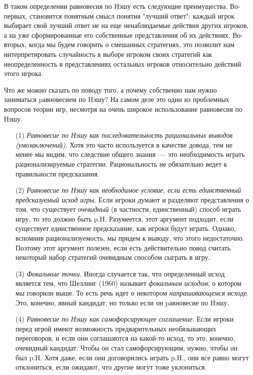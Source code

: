 {В таком определении равновесия по Нэшу есть следующие преимущества.
Во-первых, становится понятным смысл понятия "лучший ответ": каждый
игрок выбирает свой лучший ответ не на еще ненаблюдаемые действия
других игроков, а на уже сформированные его собственные
представления об их действиях. Во-вторых, когда мы будем говорить о
смешанных стратегиях, это позволит нам интерпретировать случайность
в выборе игроком своих стратегий как неопределенность в
представлениях остальных игроков относительно действий этого игрока.


Что же можно сказать по поводу того, а почему собственно нам нужно
заниматься pавновесием по Hэшу? На самом деле это один из проблемных вопросов
теории игр, несмотря на очень широкое использование равновесия по Нэшу.
\begin{itemize}
\item[(1)] {\it Равновесие по Нэшу как последовательность рациональных
выводов (умозаключений)}. Хотя это часто используется в качестве
довода, тем не менее мы видим, что следствие общего знания~--- это
необходимость играть рационализируемые стратегии.  Рациональность не
обязательно ведет к правильности предсказания.

\item[(2)] {{\it Равновесие по Нэшу как необходимое условие, если есть
единственный предсказуемый исход игры}. Если игроки думают и
разделяют представления о том, что существует {\it очевидный} (в
частности, единственный) способ играть игру, то это должно быть p.H.
Разумеется, этот аргумент подходит, если существует  единственное
предсказание, как игроки будут играть. Однако, вспомнив
рационализуемость, мы придем к выводу, что этого недостаточно.
Поэтому этот аргумент полезен, если есть действительно повод считать
некоторый набор стратегий очевидным способом сыграть в игру.}

\item[(3)] {\it Фокальные точки}. Иногда случается так, что  определенный
исход является тем, что Шеллинг (1960) называет {\it фокальным
исходом}, о котором мы говорили выше. То есть речь идет о некотором
\emph{напрашивающемся} исходе. Это, конечно, явный кандидат, но
только если он pавновесие по Hэшу.

\item[(4)] {\it Равновесие по Нэшу как самофорсирующее соглашение}.
Если игроки перед игрой имеют возможность предварительных
необязывающих переговоров, и если они соглашаются на какой-то исход,
то это, конечно, очевидный кандидат. Чтобы он стал самофорсирующим,
нужно, чтобы он был p.H. Хотя даже, если они договорились играть
p.H., они все равно могут отклониться, если ожидают, что другие
могут тоже уклониться.


\end{itemize}}

